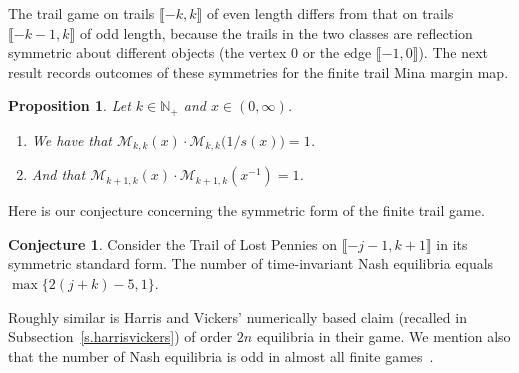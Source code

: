 \documentclass[letterpaper,11pt,oneside,reqno]{amsbook}
\newcommand{\N}{\ensuremath{\mathbb{N}}}
\numberwithin{figure}{chapter}
\newtheorem{proposition}[theorem]{Proposition}
\theoremstyle{definition}
\theoremstyle{definition}
\theoremstyle{definition}
\theoremstyle{definition}
\theoremstyle{definition}
\newtheorem{conjecture}[theorem]{Conjecture}
\newcommand{\nwithoutzero}{\N_+}
\newcommand{\minamm}{\mathcal{M}}
\begin{document}
The trail game on trails $\llbracket -k,k \rrbracket$ of even length differs from that on trails $\llbracket -k-1,k \rrbracket$ of odd length, because the trails in the two classes are reflection symmetric about different objects (the vertex $0$ or the edge $\llbracket -1,0 \rrbracket$). The next result records outcomes of these symmetries for the finite trail Mina margin map.
 \begin{proposition}\label{p.rkvalues}
Let $k \in \nwithoutzero$ and $x \in (0,\infty)$.
\begin{enumerate}
\item We have that $\minamm_{k,k}(x) \cdot \minamm_{k,k} \big( 1/s(x)\big) = 1$.
\item And that $\minamm_{k+1,k}(x) \cdot \minamm_{k+1,k}(x^{-1}) = 1$.
\end{enumerate}
 \end{proposition}
 Here is our conjecture concerning the symmetric form of the finite trail game.
\begin{conjecture}\label{c.tine}
Consider the Trail of Lost Pennies on $\llbracket -j-1,k+1 \rrbracket$ in its symmetric standard form.
The number of time-invariant Nash equilibria equals $\max \big\{ 2(j+k) - 5,1 \big\}$.
\end{conjecture} 
Roughly similar is Harris and Vickers'  numerically based claim (recalled in Subsection~\ref{s.harrisvickers}) of order $2n$ equilibria in their game. 
We mention also that the number of Nash equilibria is odd in almost all finite games~\cite{Wilson1971}.
\end{document}
